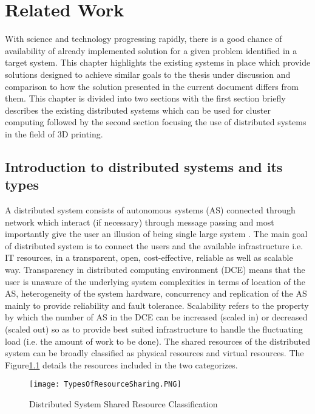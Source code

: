 \chapter{Related Work}

With science and technology progressing rapidly, there is a good chance of availability of already implemented solution for a given problem identified in a target system. This chapter highlights the existing systems in place which provide solutions designed to achieve similar goals to the thesis under discussion and comparison to how the solution presented in the current document differs from them. This chapter is divided into two sections with the first section briefly describes the existing distributed systems which can be used for cluster computing followed by the second section focusing the use of distributed systems in the field of 3D printing.

\section{Introduction to distributed systems and its types}
A distributed system consists of autonomous systems (AS) connected through network which interact (if necessary) through message passing and most importantly give the user an illusion of being single large system \cite{DCE}. The main goal of distributed system is to connect the users and the available infrastructure i.e. IT resources, in a transparent, open, cost-effective, reliable as well as scalable way. Transparency in distributed computing environment (DCE) means that the user is unaware of the underlying system complexities in terms of location of the AS, heterogeneity of the system hardware, concurrency and replication of the AS mainly to provide reliability and fault tolerance. Scalability refers to the property by which the number of AS in the DCE can be increased (scaled in) or decreased (scaled out) so as to provide best suited infrastructure to handle the fluctuating load (i.e. the amount of work to be done). The shared resources of the distributed system can be broadly classified as physical resources and virtual resources. The Figure\ref{fig:TypesOfResourceSharing} details the resources included in the two categorizes. 

\begin{figure}[ht!]
\centering
\texttt{[image: TypesOfResourceSharing.PNG]}
\caption{Distributed System Shared Resource Classification}
\label{fig:TypesOfResourceSharing}
\end{figure}
  
